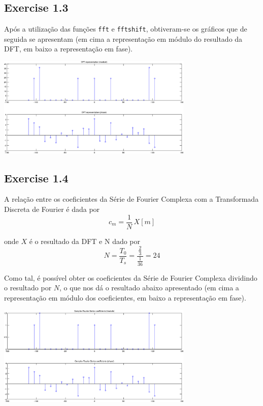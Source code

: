 \documentclass[a4paper]{article}
\begin{document}
\subsection{Exercise 1.3}
\noindent Após a utilização das funções \texttt{fft} e \texttt{fftshift}, obtiveram-se os gráficos que de seguida se apresentam (em cima a representação em módulo do resultado da DFT, em baixo a representação em fase).
\begin{center}
	\includegraphics[width=0.70\textwidth]{images/ex_1_3.png}
	\label{fig:ex_1_3}
\end{center}

\subsection{Exercise 1.4}
\label{subsec:ex_1_4}
\noindent A relação entre os coeficientes da Série de Fourier Complexa com a Transformada Discreta de Fourier é dada por
\begin{equation}
	c_m = \frac{1}{N} \, X[m]
\end{equation}

\noindent onde $X$ é o resultado da DFT e N dado por
\begin{equation}
	N = \frac{T_0}{T_s} = \frac{\frac{2}{3}}{\frac{1}{36}} = 24
\end{equation}
\clearpage

\noindent Como tal, é possível obter os coeficientes da Série de Fourier Complexa dividindo o resultado por $N$, o que nos dá o resultado abaixo apresentado (em cima a representação em módulo dos coeficientes, em baixo a representação em fase).

\begin{center}
	\includegraphics[width=0.70\textwidth]{images/ex_1_4.png}
	\label{fig:ex_1_4}
\end{center}
\end{document}
